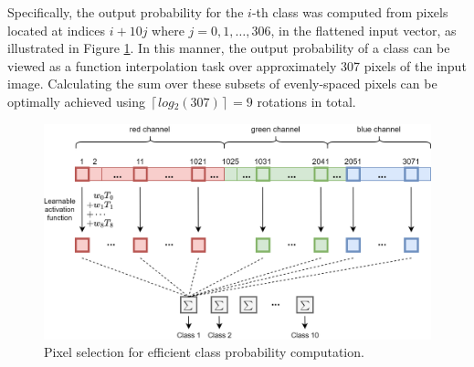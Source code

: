\documentclass[article]{iacrtrans}
\begin{document}
Specifically, the output probability for the $i$-th class was computed from pixels located at indices $i+10j$ where $j=0,1,…,306$, in the flattened input vector, as illustrated in Figure \ref{fig:pixel-selection}. In this manner, the output probability of a class can be viewed as a function interpolation task over approximately 307 pixels of the input image. Calculating the sum over these subsets of evenly-spaced pixels can be optimally achieved using $\left\lceil log⁡_2(307)\right\rceil =9$ rotations in total.
\begin{figure}[H]
    \centering
    \includegraphics[width=1\linewidth]{figures_cifar/pixel_selection.png}
    \caption{Pixel selection for efficient class probability computation.}
    \label{fig:pixel-selection}    
\end{figure}
\end{document}
